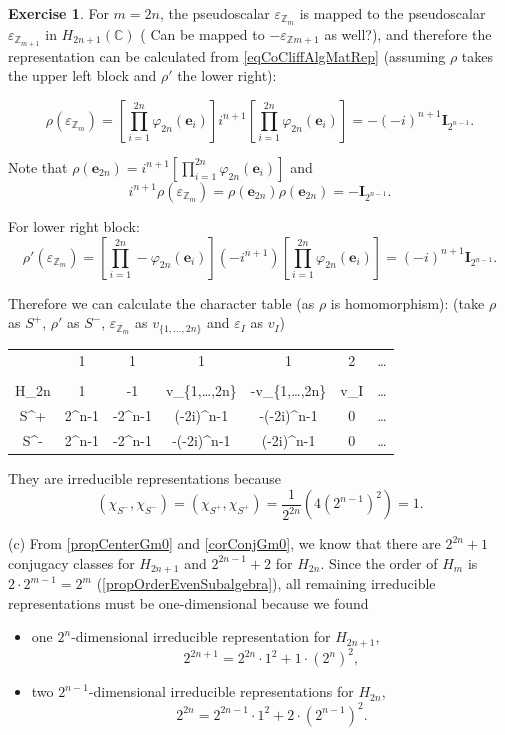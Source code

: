 \documentclass[12pt, letterpaper]{article}
\newcommand{\inte}{\mathbb{Z}}
\newcommand{\co}{\mathbb{C}}
\newcommand{\idm}{\mathbf{I}}
\newcommand{\bfe}{\mathbf{e}}
\newcommand{\red}[1]{{\color{red} #1}}
\theoremstyle{definition}
\theoremstyle{remark}
\theoremstyle{definition}
\newtheorem{exe}{Exercise}[section]
\theoremstyle{plain}
\numberwithin{equation}{section}
\begin{document}
\begin{exe}
		For $m=2n$, the pseudoscalar $\varepsilon_{\inte_m}$ is mapped to the pseudoscalar $\varepsilon_{\inte_{m+1}}$ in $H_{2n+1}(\co)$
		(\red{Can be mapped to $-\varepsilon_{\inte{m+1}}$ as well?}),
		and therefore the representation can be calculated from \eqref{eqCoCliffAlgMatRep}
		(assuming $\rho$ takes the upper left block and $\rho'$ the lower right):
		
		\[\rho(\varepsilon_{\inte_m}) = \left[\prod_{i=1}^{2n}\varphi_{2n}(\bfe_i)\right]i^{n+1}
		\left[\prod_{i=1}^{2n}\varphi_{2n}(\bfe_i)\right]=-(-i)^{n+1}\idm_{2^{n-1}}. \]
		
		Note that $\rho(\bfe_{2n})=i^{n+1}
		\left[\prod_{i=1}^{2n}\varphi_{2n}(\bfe_i)\right]$ and \[i^{n+1}\rho(\varepsilon_{\inte_m})=\rho(\bfe_{2n})\rho(\bfe_{2n})=-\idm_{2^{n-1}}.\]
		
		For lower right block:
		\[\rho'(\varepsilon_{\inte_m}) = \left[\prod_{i=1}^{2n}-\varphi_{2n}(\bfe_i)\right](-i^{n+1})
		\left[\prod_{i=1}^{2n}\varphi_{2n}(\bfe_i)\right]=(-i)^{n+1}\idm_{2^{n-1}}. \]
	
		Therefore we can calculate the character table (as $\rho$ is homomorphism): (take $\rho$ as $S^+$, $\rho'$ as $S^-$,
		$\varepsilon_{\inte_m}$ as $v_{\{1,\dots,2n\}}$ and $\varepsilon_I$ as $v_I$)
		\begin{center}
			\begin{tabular}{C | C C C C C C}
				& 1 & 1 & 1 & 1 & 2 & \dots \\
				\\
				H_{2n}& 1 & -1 & v_{\{1,\dots,2n\}} & -v_{\{1,\dots,2n\}} & \pm v_I & \dots\\
				\hline
				S^+ & 2^{n-1} & -2^{n-1} & (-2i)^{n-1} & -(-2i)^{n-1} & 0&\dots\\ 
				S^- & 2^{n-1} & -2^{n-1} & -(-2i)^{n-1} & (-2i)^{n-1} & 0&\dots\\ 				
			\end{tabular}
		\end{center}
	
		They are irreducible representations because 
		\[(\chi_{S^-},\chi_{S^-})=(\chi_{S^+},\chi_{S^+})=\frac{1}{2^{2n}}(4(2^{n-1})^2)=1.\]
	
		(c)	From \ref{propCenterGm0} and \ref{corConjGm0}, we know that there are
		$2^{2n}+1$ conjugacy classes for $H_{2n+1}$ and $2^{2n-1}+2$ for $H_{2n}$.
		Since the order of $H_m$ is $2\cdot2^{m-1}=2^m$ (\ref{propOrderEvenSubalgebra}),
		all remaining irreducible representations must be one-dimensional %
		because we found
		\begin{itemize}
			\item one $2^n$-dimensional irreducible representation for $H_{2n+1}$,
			\[2^{2n+1}=2^{2n}\cdot 1^2+1\cdot (2^n)^2,\]
			\item two $2^{n-1}$-dimensional irreducible representations for $H_{2n}$,
			\[2^{2n}=2^{2n-1}\cdot 1^2+2\cdot (2^{n-1})^2.\]
		\end{itemize}
		

\end{exe}
\end{document}
